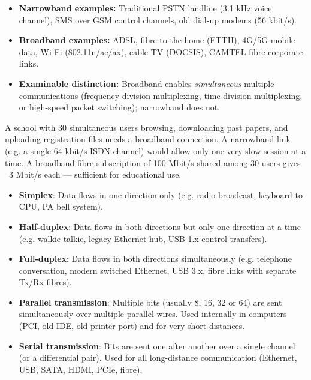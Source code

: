 \documentclass[11pt]{article}
\newcounter{popsec}
\newcounter{popsub}
\newcommand{\courssub}[1]{%
  \stepcounter{popsub}%
  \par\vspace{9pt}\noindent{\popxbold\fontsize{11.5}{13}\selectfont\color{popink}{\color{poporange}\thepopsec.\thepopsub}\hspace{6pt}#1}\par\nopagebreak\vspace{4pt}
}
\begin{document}
\begin{propriete}
\begin{itemize}
\item \textbf{Narrowband examples:} Traditional PSTN landline (3.1 kHz voice channel), SMS over GSM control channels, old dial-up modems (56 kbit/s).
\item \textbf{Broadband examples:} ADSL, fibre-to-the-home (FTTH), 4G/5G mobile data, Wi-Fi (802.11n/ac/ax), cable TV (DOCSIS), CAMTEL fibre corporate links.
\item \textbf{Examinable distinction:} Broadband enables \emph{simultaneous} multiple communications (frequency-division multiplexing, time-division multiplexing, or high-speed packet switching); narrowband does not.
\end{itemize}
\end{propriete}

\begin{exemplebox}
A school with 30 simultaneous users browsing, downloading past papers, and uploading registration files needs a broadband connection. A narrowband link (e.g. a single 64 kbit/s ISDN channel) would allow only one very slow session at a time. A broadband fibre subscription of 100 Mbit/s shared among 30 users gives ~3 Mbit/s each — sufficient for educational use.
\end{exemplebox}

\courssub{Lesson 29: Types of Data Transmission}

\begin{definition}
\begin{itemize}
\item \textbf{Simplex}: Data flows in one direction only (e.g. radio broadcast, keyboard to CPU, PA bell system).
\item \textbf{Half-duplex}: Data flows in both directions but only one direction at a time (e.g. walkie-talkie, legacy Ethernet hub, USB 1.x control transfers).
\item \textbf{Full-duplex}: Data flows in both directions simultaneously (e.g. telephone conversation, modern switched Ethernet, USB 3.x, fibre links with separate Tx/Rx fibres).
\end{itemize}
\end{definition}

\begin{definition}
\begin{itemize}
\item \textbf{Parallel transmission}: Multiple bits (usually 8, 16, 32 or 64) are sent simultaneously over multiple parallel wires. Used internally in computers (PCI, old IDE, old printer port) and for very short distances.
\item \textbf{Serial transmission}: Bits are sent one after another over a single channel (or a differential pair). Used for all long-distance communication (Ethernet, USB, SATA, HDMI, PCIe, fibre).
\end{itemize}
\end{definition}
\end{document}

